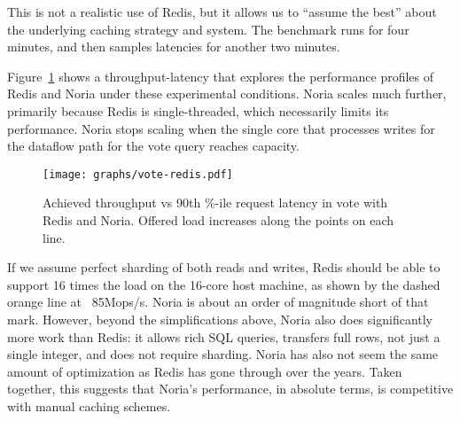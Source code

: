 This is not a realistic use of Redis, but it allows us to ``assume the best''
about the underlying caching strategy and system. The benchmark runs for four
minutes, and then samples latencies for another two minutes.

Figure~\ref{f:vote-redis} shows a throughput-latency that explores the
performance profiles of Redis and Noria under these experimental conditions.
Noria scales much further, primarily because Redis is single-threaded, which
necessarily limits its performance. Noria stops scaling when the single core
that processes writes for the dataflow path for the vote query reaches capacity.

\begin{figure}[ht]
  \centering
  \texttt{[image: graphs/vote-redis.pdf]}
  \caption{Achieved throughput vs 90th \%-ile request latency in vote with Redis
  and Noria. Offered load increases along the points on each line.}
  \label{f:vote-redis}
\end{figure}

If we assume perfect sharding of both reads and writes, Redis should be able to
support 16 times the load on the 16-core host machine, as shown by the dashed
orange line at ~85Mops/s. Noria is about an order of magnitude short of that
mark. However, beyond the simplifications above, Noria also does significantly
more work than Redis: it allows rich SQL queries, transfers full rows, not just
a single integer, and does not require sharding. Noria has also not seem the
same amount of optimization as Redis has gone through over the years. Taken
together, this suggests that Noria's performance, in absolute terms, is
competitive with manual caching schemes.

